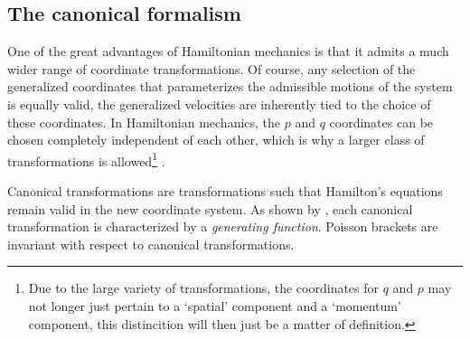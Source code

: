\subsection{The canonical formalism}
One of the great advantages of Hamiltonian mechanics is that it admits a much wider range of coordinate transformations. Of course, any selection of the generalized coordinates that parameterizes the admissible motions of the system is equally valid, the generalized velocities are inherently tied to the choice of these coordinates. In Hamiltonian mechanics, the \(p\) and \(q\) coordinates can be chosen completely independent of each other, which is why a larger class of transformations is allowed\footnote{Due to the large variety of transformations, the coordinates for \(q\) and \(p\) may not longer just pertain to a `spatial' component and a `momentum' component, this distincition will then just be a matter of definition.} \cite{Landau1960}.

Canonical transformations are transformations such that Hamilton's equations remain valid in the new coordinate system. As shown by \citet{Landau1960}, each canonical transformation is characterized by a \emph{generating function}. Poisson brackets are invariant with respect to canonical transformations.


